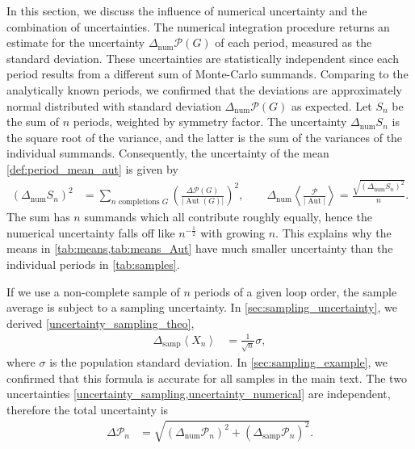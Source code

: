 \documentclass[11pt,a4paper]{article}
\newcommand{\abs}[1]{\lvert #1 \rvert}
\newcommand{\period}{\mathcal P}
\newcommand{\Aut}{\operatorname{Aut}}
\renewcommand{\|}{\rule[-0.4ex]{0.2ex}{1.2em}}
\begin{document}
In this section, we discuss the influence of numerical uncertainty and the combination of uncertainties.
The numerical integration procedure returns an estimate for the uncertainty $\Delta_\text{num} \period(G)$ of each period, measured as the   standard deviation. These uncertainties are statistically independent  since each period  results from a different sum of   Monte-Carlo summands. Comparing to the analytically known periods, we confirmed that the deviations are approximately normal distributed with standard deviation $  \Delta_\text{num} \period(G)$ as expected.  Let $S_n$ be the sum of $n$ periods, weighted by symmetry factor. The uncertainty $ \Delta_\text{num} S_n$ is the square root of the variance, and the latter is the sum of the variances of the individual summands. Consequently, the uncertainty of the mean \cref{def:period_mean_aut} is given by
\begin{align}\label{uncertainty_numerical}
	\left( \Delta_\text{num} S_n \right) ^2 &=\sum_{ n \text{ completions }G } \left(\frac{\Delta \period(G)} {  \abs{\Aut(G)}}  \right)^2,  \qquad  \Delta_\text{num} \left \langle \frac{\period}{\abs{\Aut }} \right \rangle  = \frac{\sqrt{\left( \Delta_\text{num} S_n \right) ^2 }}{n}    .
\end{align} 
The sum   has $n$ summands which all contribute roughly equally, hence the numerical uncertainty falls off  like $n ^{-\frac 12}$ with growing $n$. This explains why the means in \cref{tab:means,tab:means_Aut} have much smaller uncertainty than the individual periods in \cref{tab:samples}. 

If we use a non-complete sample of $n$ periods of a given loop order, the sample average is subject to a sampling uncertainty. In \cref{sec:sampling_uncertainty}, we derived \cref{uncertainty_sampling_theo},
\begin{align}\label{uncertainty_sampling}
	\Delta_{\text{samp}} \left \langle X_n \right \rangle  &= \frac{1}{\sqrt n } \sigma,
\end{align}
where $\sigma$ is the population standard deviation. In \cref{sec:sampling_example}, we confirmed that this formula is accurate for all samples in the main text. 
The two uncertainties \cref{uncertainty_sampling,uncertainty_numerical} are  independent, therefore the total uncertainty is
\begin{align}\label{uncertainty_combined}
\Delta \period_n &= \sqrt{\left(\Delta_\text{num} \period_n\right) ^ 2  +   \left( \Delta_\text{samp}  \period_n \right)^2 }  .
\end{align}
\end{document}
